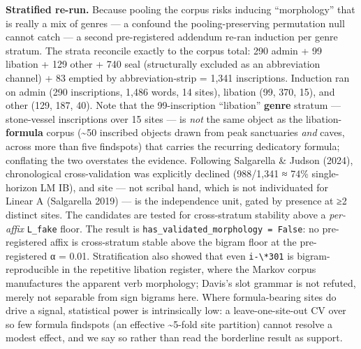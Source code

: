 \documentclass[
  10pt,
]{article}
\begin{document}
\textbf{Stratified re-run.} Because pooling the corpus risks inducing
``morphology'' that is really a mix of genres --- a confound the
pooling-preserving permutation null cannot catch --- a second
pre-registered addendum re-ran induction per genre stratum. The strata
reconcile exactly to the corpus total: 290 admin + 99 libation + 129
other + 740 seal (structurally excluded as an abbreviation channel) + 83
emptied by abbreviation-strip = 1,341 inscriptions. Induction ran on
admin (290 inscriptions, 1,486 words, 14 sites), libation (99, 370, 15),
and other (129, 187, 40). Note that the 99-inscription ``libation''
\textbf{genre} stratum --- stone-vessel inscriptions over 15 sites ---
is \emph{not} the same object as the libation-\textbf{formula} corpus
(\textasciitilde50 inscribed objects drawn from peak sanctuaries
\emph{and} caves, across more than five findspots) that carries the
recurring dedicatory formula; conflating the two overstates the
evidence. Following Salgarella \& Judson (2024), chronological
cross-validation was explicitly declined (988/1,341 ≈ 74\%
single-horizon LM IB), and site --- not scribal hand, which is not
individuated for Linear A (Salgarella 2019) --- is the independence
unit, gated by presence at ≥2 distinct sites. The candidates are tested
for cross-stratum stability above a \emph{per-affix} \texttt{L\_fake}
floor. The result is \texttt{has\_validated\_morphology\ =\ False}: no
pre-registered affix is cross-stratum stable above the bigram floor at
the pre-registered α = 0.01. Stratification also showed that even
\texttt{i-\textbackslash{}*301} is bigram-reproducible in the repetitive
libation register, where the Markov corpus manufactures the apparent
verb morphology; Davis's slot grammar is not refuted, merely not
separable from sign bigrams here. Where formula-bearing sites do drive a
signal, statistical power is intrinsically low: a leave-one-site-out CV
over so few formula findspots (an effective \textasciitilde5-fold site
partition) cannot resolve a modest effect, and we say so rather than
read the borderline result as support.
\end{document}
